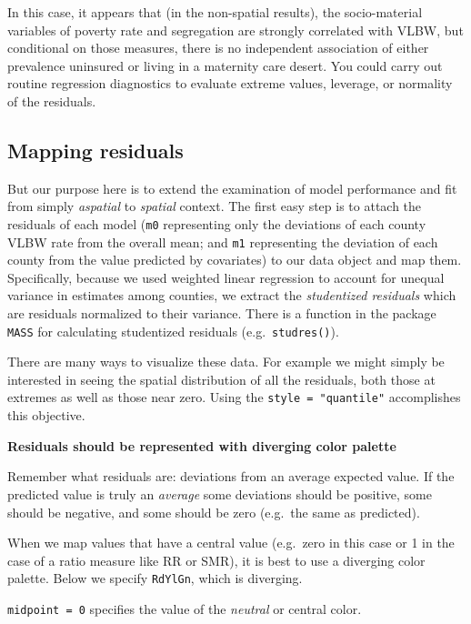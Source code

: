\documentclass[
]{book}
\newenvironment{Shaded}{\begin{snugshade}}{\end{snugshade}}
\newcommand{\FunctionTok}[1]{\textcolor[rgb]{0.00,0.00,0.00}{#1}}
\newcommand{\NormalTok}[1]{#1}
\newcommand{\OtherTok}[1]{\textcolor[rgb]{0.56,0.35,0.01}{#1}}
\newcommand{\SpecialCharTok}[1]{\textcolor[rgb]{0.00,0.00,0.00}{#1}}
\newenvironment{rmdtip}[1]
  {
  \begin{itemize}
  \renewcommand{\labelitemi}{
    \raisebox{-.7\height}[0pt][0pt]{
      {\setkeys{Gin}{width=3em,keepaspectratio}\texttt{[image: images/\#1]}}
    }
  }
  \setlength{\fboxsep}{1em}
  \begin{tip}
  \item
  }
  {
  \end{tip}
  \end{itemize}
  }
\begin{document}
In this case, it appears that (in the non-spatial results), the socio-material variables of poverty rate and segregation are strongly correlated with VLBW, but conditional on those measures, there is no independent association of either prevalence uninsured or living in a maternity care desert. You could carry out routine regression diagnostics to evaluate extreme values, leverage, or normality of the residuals.

\hypertarget{mapping-residuals}{%
\subsection{Mapping residuals}\label{mapping-residuals}}

But our purpose here is to extend the examination of model performance and fit from simply \emph{aspatial} to \emph{spatial} context. The first easy step is to attach the residuals of each model (\texttt{m0} representing only the deviations of each county VLBW rate from the overall mean; and \texttt{m1} representing the deviation of each county from the value predicted by covariates) to our data object and map them. Specifically, because we used weighted linear regression to account for unequal variance in estimates among counties, we extract the \emph{studentized residuals} which are residuals normalized to their variance. There is a function in the package \texttt{MASS} for calculating studentized residuals (e.g.~\texttt{studres()}).

\begin{Shaded}
\end{Shaded}

There are many ways to visualize these data. For example we might simply be interested in seeing the spatial distribution of all the residuals, both those at extremes as well as those near zero. Using the \texttt{style\ =\ "quantile"} accomplishes this objective.

\begin{rmdtip}{tip}
\textbf{Residuals should be represented with diverging color palette}

Remember what residuals are: deviations from an average expected value. If the predicted value is truly an \emph{average} some deviations should be positive, some should be negative, and some should be zero (e.g.~the same as predicted).

When we map values that have a central value (e.g.~zero in this case or 1 in the case of a ratio measure like RR or SMR), it is best to use a diverging color palette. Below we specify \texttt{RdYlGn}, which is diverging.

\texttt{midpoint\ =\ 0} specifies the value of the \emph{neutral} or central color.

\end{rmdtip}
\end{document}
